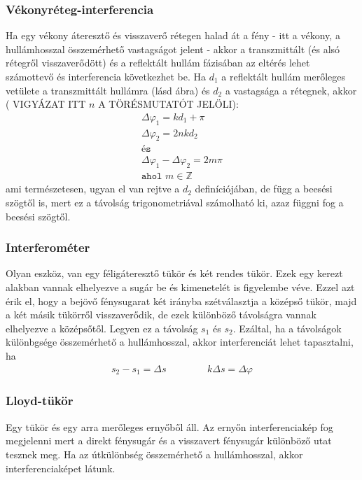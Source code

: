 \documentclass{article}
\begin{document}
\subsubsection{Vékonyréteg-interferencia}
Ha egy vékony áteresztő és visszaverő rétegen halad át a  fény - itt a vékony, a hullámhosszal összemérhető vastagságot jelent - akkor a transzmittált (és alsó rétegről visszaverődött) és a reflektált hullám fázisában az eltérés lehet számottevő és interferencia következhet be. Ha $d_1$ a reflektált hullám merőleges vetülete a transzmittált hullámra (lásd ábra) és $d_2$ a vastagsága a rétegnek, akkor ( VIGYÁZAT ITT $n$ A TÖRÉSMUTATÓT JELÖLI):
\begin{gather*}
\Delta \varphi_1 = kd_1 + \pi \\
\Delta \varphi_2 = 2nkd_2 \\
\texttt{és}\\
\Delta \varphi_1-\Delta \varphi_2 = 2m\pi \\
\texttt{ahol } m \in \mathbb{Z}
\end{gather*}
ami természetesen, ugyan el van rejtve a $d_2$ definíciójában, de függ a beesési szögtől is, mert ez a távolság trigonometriával számolható ki, azaz függni fog a beesési szögtől.
\subsubsection{Interferométer}
Olyan eszköz, van egy féligáteresztő tükör és két rendes tükör. Ezek egy kerezt alakban vannak elhelyezve a sugár be és kimenetelét is figyelembe véve. Ezzel azt érik el, hogy a bejövő fénysugarat két irányba szétválasztja a középső tükör, majd a két másik tükörről visszaverődik, de ezek különböző távolságra vannak elhelyezve a középsőtől. Legyen ez a távolság $s_1$ és $s_2$. Ezáltal, ha a távolságok különbgsége összemérhető a hullámhosszal, akkor interferenciát lehet tapasztalni, ha
\begin{gather*}
s_2-s_1 = \Delta s \hspace{50pt} k\Delta s = \Delta \varphi
\end{gather*}
\subsubsection{Lloyd-tükör}
Egy tükör és egy arra merőleges ernyőből áll.  Az ernyőn interferenciakép fog megjelenni mert a direkt fénysugár és a visszavert fénysugár különböző utat tesznek meg. Ha az útkülönbség összemérhető a hullámhosszal, akkor interferenciaképet látunk.
\end{document}

